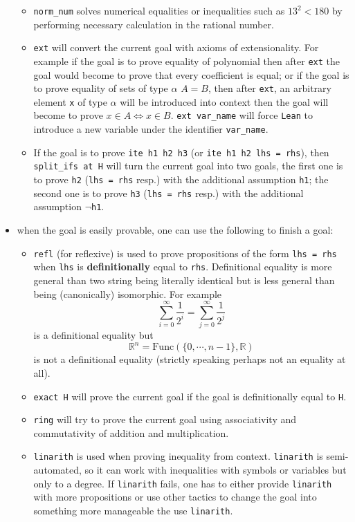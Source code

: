 \documentclass{report}
\theoremstyle{definition}
\begin{document}
\begin{itemize}
\begin{itemize}
    \item {\tt \small norm\_num} solves numerical equalities or inequalities such as $13^2 < 180$ by performing necessary calculation in the rational number.

    \item {\tt \small ext} will convert the current goal with axioms of extensionality. For example if the goal is to prove equality of polynomial then after {\tt \small ext} the goal would become to prove that every coefficient is equal; or if the goal is to prove equality of sets of type $\alpha$ $A=B$, then after {\tt \small ext}, an arbitrary element {\tt \small x} of type $\alpha$ will be introduced into context then the goal will become to prove $x\in A\iff x\in B$. {\tt \small ext var\_name} will force {\tt \small Lean} to introduce a new variable under the identifier {\tt \small var\_name}.
    \item If the goal is to prove {\tt \small ite h1 h2 h3} (or {\tt \small ite h1 h2 lhs = rhs}), then {\tt \small split\_ifs at H} will turn the current goal into two goals, the first one is to prove {\tt \small h2} ({\tt \small lhs = rhs} resp.) with the additional assumption {\tt \small h1}; the second one is to prove {\tt \small h3} ({\tt \small lhs = rhs} resp.) with the additional assumption {\tt \small $\neg$h1}.
  \end{itemize}

  \item when the goal is easily provable, one can use the following to finish a goal:
  \begin{itemize}
    \item {\tt \small refl} (for reflexive) is used to prove propositions of the form {\tt \small lhs = rhs} when {\tt \small lhs} is {\bf definitionally} equal to {\tt \small rhs}. Definitional equality is more general than two string being literally identical but is less general than being (canonically) isomorphic. For example
    $$
  \sum_{i=0}^\infty \frac{1}{2^i}=\sum_{j=0}^\infty \frac{1}{2^j}
    $$
    is a definitional equality but
    $$
  \mathbb R^n = \mathrm{Func}\left(\{0,\cdots, n-1\},\mathbb R\right)
    $$ is not a definitional equality (strictly speaking perhaps not an equality at all).
    \item {\tt \small exact H} will prove the current goal if the goal is definitionally equal to {\tt \small H}. 
  
    \item {\tt \small ring} will try to prove the current goal using associativity and commutativity of addition and multiplication.
    \item {\tt \small linarith} is used when proving inequality from context. {\tt \small linarith} is semi-automated, so it can work with inequalities with symbols or variables but only to a degree. If {\tt \small linarith} fails, one has to either provide {\tt \small linarith} with more propositions or use other tactics to change the goal into something more manageable the use {\tt \small linarith}.
  

\end{itemize}
\end{itemize}
\end{document}
